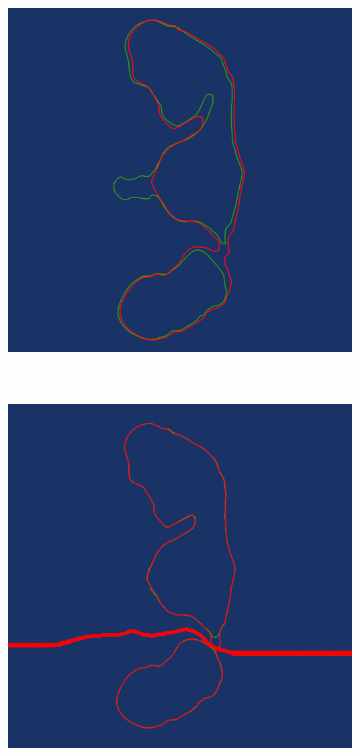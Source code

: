 \documentclass[3p,times]{elsarticle}
\begin{document}
\begin{figure}[ht]
\centering
\begin{subfigure}[b]{0.25\textwidth}
\includegraphics[width=\textwidth]{../picture/Medial_original_20_21.png}
\caption{}
\label{fig:Medial_original_20_21}
\end{subfigure}
~~~~~~~~~~~~~~~~~~~~~~~~~~~~~~~~~~~~
\begin{subfigure}[b]{0.25\textwidth}
\includegraphics[width=\textwidth]{../picture/Medial_transformed_20_21.png}
\caption{}
\label{fig:Medial_transformed_20_21}
\end{subfigure}


\end{figure}
\end{document}
